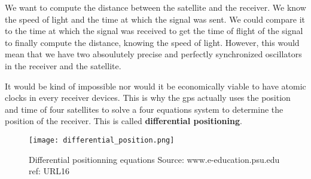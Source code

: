 We want to compute the distance between the satellite and the receiver. We know the speed of light and the time at which the signal was sent. We could compare it to the time at which the signal was received to get the time of flight of the signal to finally compute the distance, knowing the speed of light. However, this would mean that we have two absoulutely precise and perfectly synchronized oscillators in the receiver and the satellite.

It would be kind of impossible nor would it be economically viable to have atomic clocks in every receiver devices. This is why the \gls{gps} actually uses the position and time of four satellites to solve a four equations system to determine the position of the receiver. This is called \textbf{differential positioning}.


\begin{figure}[H]
	\centering
	\texttt{[image: differential\_position.png]}
	\caption[Differential positionning equations]{Differential positionning equations Source: www.e-education.psu.edu ref: URL16}
	\label{fig:differential_position}
\end{figure}






